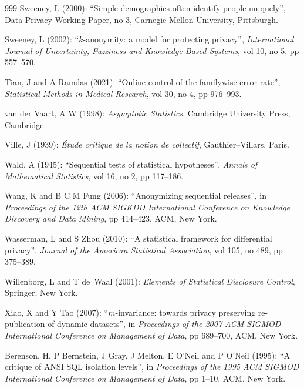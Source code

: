\begin{thebibliography}{999}
Sweeney, L (2000): ``Simple demographics often identify people uniquely'', Data Privacy Working Paper, no 3, Carnegie Mellon University, Pittsburgh.

Sweeney, L (2002): ``$k$-anonymity: a model for protecting privacy'', \emph{International Journal of Uncertainty, Fuzziness and Knowledge-Based Systems}, vol 10, no 5, pp 557--570.

Tian, J and A Ramdas (2021): ``Online control of the familywise error rate'', \emph{Statistical Methods in Medical Research}, vol 30, no 4, pp 976--993.

van der Vaart, A W (1998): \emph{Asymptotic Statistics}, Cambridge University Press, Cambridge.

Ville, J (1939): \emph{\'Etude critique de la notion de collectif}, Gauthier--Villars, Paris.

Wald, A (1945): ``Sequential tests of statistical hypotheses'', \emph{Annals of Mathematical Statistics}, vol 16, no 2, pp 117--186.

Wang, K and B C M Fung (2006): ``Anonymizing sequential releases'', in \emph{Proceedings of the 12th ACM SIGKDD International Conference on Knowledge Discovery and Data Mining}, pp 414--423, ACM, New York.

Wasserman, L and S Zhou (2010): ``A statistical framework for differential privacy'', \emph{Journal of the American Statistical Association}, vol 105, no 489, pp 375--389.

Willenborg, L and T de~Waal (2001): \emph{Elements of Statistical Disclosure Control}, Springer, New York.

Xiao, X and Y Tao (2007): ``$m$-invariance: towards privacy preserving re-publication of dynamic datasets'', in \emph{Proceedings of the 2007 ACM SIGMOD International Conference on Management of Data}, pp 689--700, ACM, New York.

Berenson, H, P Bernstein, J Gray, J Melton, E O'Neil and P O'Neil (1995): ``A critique of ANSI SQL isolation levels'', in \emph{Proceedings of the 1995 ACM SIGMOD International Conference on Management of Data}, pp 1--10, ACM, New York.


\end{thebibliography}
